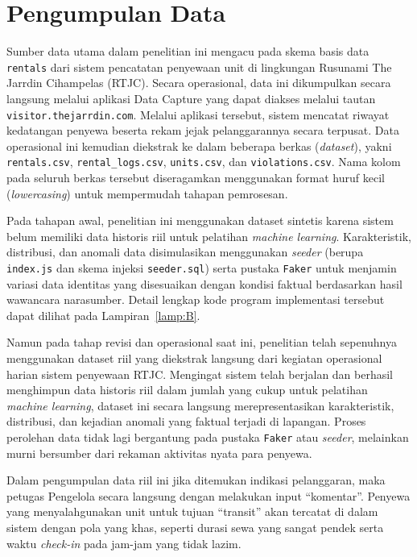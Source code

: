 \section{Pengumpulan Data}

Sumber data utama dalam penelitian ini mengacu pada skema basis data \texttt{rentals} dari sistem pencatatan penyewaan unit di lingkungan Rusunami The Jarrdin Cihampelas (RTJC). Secara operasional, data ini dikumpulkan secara langsung melalui aplikasi Data Capture yang dapat diakses melalui tautan \texttt{visitor.thejarrdin.com}. Melalui aplikasi tersebut, sistem mencatat riwayat kedatangan penyewa beserta rekam jejak pelanggarannya secara terpusat. Data operasional ini kemudian diekstrak ke dalam beberapa berkas (\textit{dataset}), yakni \texttt{rentals.csv}, \texttt{rental\_logs.csv}, \texttt{units.csv}, dan \texttt{violations.csv}. Nama kolom pada seluruh berkas tersebut diseragamkan menggunakan format huruf kecil (\textit{lowercasing}) untuk mempermudah tahapan pemrosesan.

Pada tahapan awal, penelitian ini menggunakan dataset sintetis karena sistem belum memiliki data historis riil untuk pelatihan \textit{machine learning}. Karakteristik, distribusi, dan anomali data disimulasikan menggunakan \textit{seeder} (berupa \texttt{index.js} dan skema injeksi \texttt{seeder.sql}) serta pustaka \texttt{Faker} untuk menjamin variasi data identitas yang disesuaikan dengan kondisi faktual berdasarkan hasil wawancara narasumber. Detail lengkap kode program implementasi tersebut dapat dilihat pada Lampiran~\ref{lamp:B}. 

Namun pada tahap revisi dan operasional saat ini, penelitian telah sepenuhnya menggunakan dataset riil yang diekstrak langsung dari kegiatan operasional harian sistem penyewaan RTJC. Mengingat sistem telah berjalan dan berhasil menghimpun data historis riil dalam jumlah yang cukup untuk pelatihan \textit{machine learning}, dataset ini secara langsung merepresentasikan karakteristik, distribusi, dan kejadian anomali yang faktual terjadi di lapangan. Proses perolehan data tidak lagi bergantung pada pustaka \texttt{Faker} atau \textit{seeder}, melainkan murni bersumber dari rekaman aktivitas nyata para penyewa.

Dalam pengumpulan data riil ini jika ditemukan indikasi pelanggaran, maka petugas Pengelola secara langsung dengan melakukan input ``komentar''. Penyewa yang menyalahgunakan unit untuk tujuan ``transit'' akan tercatat di dalam sistem dengan pola yang khas, seperti durasi sewa yang sangat pendek serta waktu \textit{check-in} pada jam-jam yang tidak lazim.

